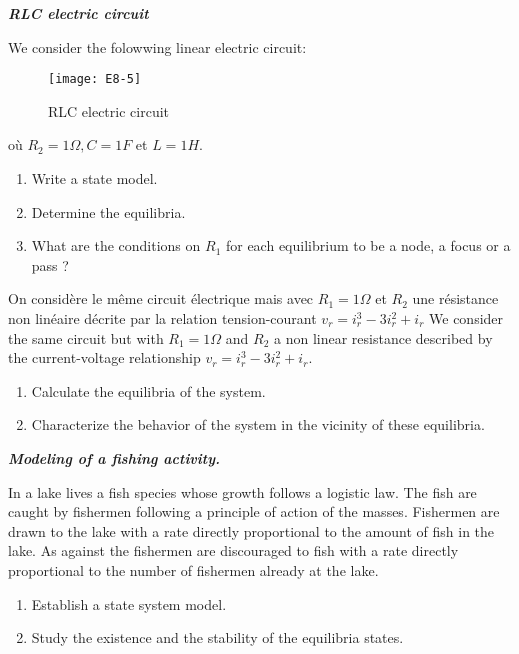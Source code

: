 \begin{exercice} {\bf \em RLC electric circuit} 

We consider the folowwing linear electric circuit:
\begin{figure}[h] 
   \centering
   \texttt{[image: E8-5]} 
   \caption{RLC electric circuit}
   \label{fig:E8-5}
\end{figure}

où $R_2 = 1\Omega, C = 1F$ et $L = 1H$.

\begin{enumerate}
\item Write a state model.
\item Determine the equilibria.
\item What are the conditions on $R_1$ for each equilibrium to be a
node, a focus or a pass ?
\end{enumerate}

On considère le même circuit électrique mais avec $R_1 = 1\Omega$ et $R_2$ une résistance non
linéaire décrite par la relation tension-courant $v_r = i^3_r - 3i^2_r + i_r$
We consider the same circuit but with $R_1 = 1\Omega$ and $R_2$ a non linear resistance
described by the current-voltage relationship $v_r = i^3_r - 3i^2_r + i_r$.
\begin{enumerate}
\item Calculate the equilibria of the system.
\item Characterize the behavior of the system in the vicinity of these equilibria.
\end{enumerate}
\end{exercice}
\vv 

\begin{exercice}{\bf \em Modeling of a fishing activity.}

In a lake lives a fish species whose growth follows a logistic law. 
The fish are caught by fishermen following a principle of action of the masses. 
Fishermen are drawn to the lake with a rate directly proportional to the amount of fish in the lake. 
As against the fishermen are discouraged to fish with a rate directly proportional to the number of fishermen already at the lake.

\begin{enumerate}
\item Establish a state system model.
\item Study the existence and the stability of the equilibria states. 
\end{enumerate}
\end{exercice}


